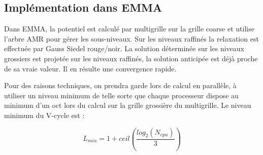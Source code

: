 
\subsection{Implémentation dans EMMA}
Dans EMMA, la potentiel est calculé par multigrille sur la grille coarse et utilise l'arbre \ac{AMR} pour gérer les sous-niveaux.
Sur les niveaux raffinés la relaxation est effectuée par Gauss Siedel rouge/noir.
La solution déterminée sur les niveaux grossiers est projetée sur les niveaux raffinés, la solution anticipée est déjà proche de sa vraie valeur. 
Il en résulte une convergence rapide.

Pour des raisons techniques, on prendra garde lors de calcul en parallèle, à utiliser un niveau minimum de telle sorte que chaque processeur dispose au minimum d'un oct lors du calcul sur la grille grossière du multigrille.
Le niveau minimum du V-cycle est : 

\begin{equation}
L_{min} = 1 + ceil \left(\frac{log_2(N_{cpu})}{3}  \right) 
\end{equation}


%
%


